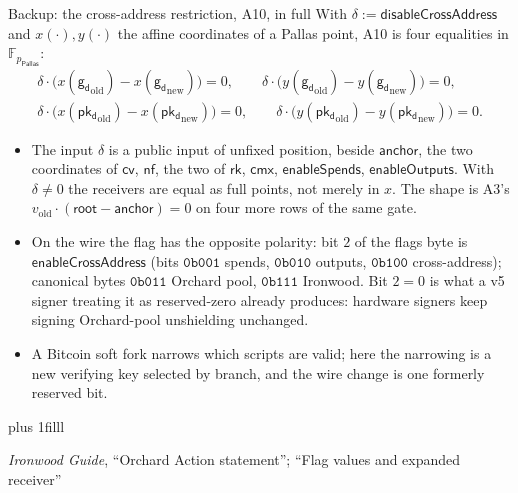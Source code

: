 \documentclass[aspectratio=169,11pt]{beamer}
\newcommand{\F}{\mathbb{F}}
\newcommand{\Pallas}{\ensuremath{\mathsf{Pallas}}}
\newcommand{\Fpp}{\ensuremath{\F_{p_{\Pallas}}}}
\newcommand{\nfsym}{\ensuremath{\mathsf{nf}}}
\newcommand{\cmx}{\ensuremath{\mathsf{cmx}}}
\newcommand{\cvsym}{\ensuremath{\mathsf{cv}}}
\newcommand{\rksym}{\ensuremath{\mathsf{rk}}}
\newcommand{\gd}{\ensuremath{\mathsf{g_d}}}
\newcommand{\pkd}{\ensuremath{\mathsf{pk_d}}}
\newcommand{\src}[1]{\par\vskip0pt plus 1filll
  {\fontsize{6}{7.2}\selectfont\color{arbdim}\raggedright #1\par}}
\begin{document}
\begin{frame}{Backup: the cross-address restriction, A10, in full}
\vspace*{-5pt}
\setlength{\abovedisplayskip}{3pt}\setlength{\belowdisplayskip}{3pt}
With $\delta := \mathsf{disableCrossAddress}$ and $x(\cdot), y(\cdot)$ the
affine coordinates of a Pallas point, A10 is four equalities in \Fpp:
\begin{gather*}
\delta \cdot \bigl(x(\gd_{\mathrm{old}}) - x(\gd_{\mathrm{new}})\bigr) = 0,
\qquad
\delta \cdot \bigl(y(\gd_{\mathrm{old}}) - y(\gd_{\mathrm{new}})\bigr) = 0,\\
\delta \cdot \bigl(x(\pkd_{\mathrm{old}}) - x(\pkd_{\mathrm{new}})\bigr) = 0,
\qquad
\delta \cdot \bigl(y(\pkd_{\mathrm{old}}) - y(\pkd_{\mathrm{new}})\bigr) = 0.
\end{gather*}
\begin{itemize}\small\setlength{\itemsep}{0pt}
  \item The input $\delta$ is a public input of unfixed position, beside
    $\mathsf{anchor}$, the two coordinates of $\cvsym$, $\nfsym$, the two
    of $\rksym$, $\cmx$, $\mathsf{enableSpends}$, $\mathsf{enableOutputs}$.
    With $\delta \ne 0$ the receivers are equal as full points, not merely
    in $x$. The shape is A3's $v_{\mathrm{old}} \cdot (\mathsf{root} -
    \mathsf{anchor}) = 0$ on four more rows of the same gate.
  \item On the wire the flag has the opposite polarity: bit $2$ of the
    flags byte is $\mathsf{enableCrossAddress}$ (bits $\mathtt{0b001}$
    spends, $\mathtt{0b010}$ outputs, $\mathtt{0b100}$ cross-address);
    canonical bytes $\mathtt{0b011}$ Orchard pool, $\mathtt{0b111}$
    Ironwood. Bit $2 = 0$ is what a v5 signer treating it as
    reserved-zero already produces: hardware signers keep signing
    Orchard-pool unshielding unchanged.
  \item A Bitcoin soft fork narrows which scripts are valid; here the
    narrowing is a new verifying key selected by branch, and the wire
    change is one formerly reserved bit.
\end{itemize}
\src{\emph{Ironwood Guide}, ``Orchard Action statement'';
``Flag values and expanded receiver''}
\end{frame}
\end{document}
